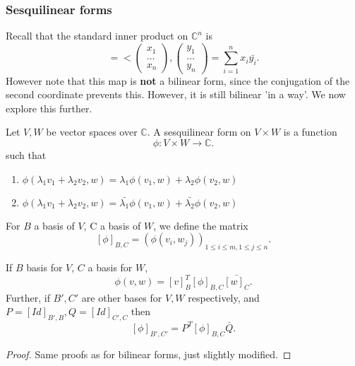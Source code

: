 \documentclass[a4paper]{scrartcl}
\begin{document}
\subsubsection{Sesquilinear forms}
Recall that the standard inner product on $\mathbb{C}^n$ is 
\[<x,y>=<\begin{pmatrix}
x_1\\\ldots \\x_n
\end{pmatrix},\begin{pmatrix}
y_1\\\ldots \\y_n
\end{pmatrix}
=\sum_{i=1}^{n}x_i \bar{y_i}
.\]
However note that this map is \textbf{not} a bilinear form, since the conjugation of the second coordinate prevents this. However, it is still bilinear 'in a way'. We now explore this further.
\begin{definition}
     Let $V,W$ be vector spaces over $\mathbb{C}$. A sesquilinear form on $V \times W$ is a function 
     \[\phi: V \times W \to \mathbb{C} .\]
     such that 
     \begin{enumerate}
         \item $\phi (\lambda_1 v_1+ \lambda_2 v_2, w)=\lambda_1 \phi (v_1,w) + \lambda_2 \phi (v_2,w)$
         \item $\phi (\lambda_1 v_1+ \lambda_2 v_2, w)=\bar{\lambda_1} \phi (v_1,w) + \bar{\lambda_2} \phi (v_2,w)$
     \end{enumerate}
     For $B$ a basis of $V$, C a basis of $W$, we define the matrix 
     \[[\phi]_{B,C}=(\phi (v_i,w_j))_{1 \leq i \leq m, 1 \leq j \leq n}.\]
\end{definition}
\begin{lemma}
     If $B$ basis for $V$, $C$ a basis for $W$,
     \[\phi (v,w)=[v]_B^T [\phi]_{B,C}\bar{[w]_C}.\]
     Further, if $B',C'$ are other bases for $V,W$ respectively, and $P=[Id]_{B',B}, Q=[Id]_{C',C}$ then 
     \[[\phi]_{B',C'}=P^T [\phi]_{B,C} \bar{Q}.\]
     
\end{lemma}
\begin{proof}
     Same proofs as for bilinear forms, just slightly modified.
\end{proof}
\end{document}
